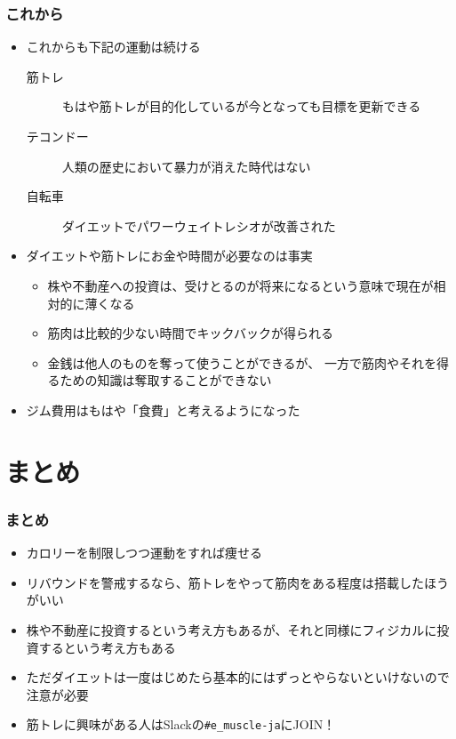 \begin{frame}
  \frametitle{これから}

  \pause
  \begin{itemize}
    \item<+-> これからも下記の運動は続ける
    \begin{description}
      \item[筋トレ]
      もはや筋トレが目的化しているが今となっても目標を更新できる

      \item[テコンドー]
      人類の歴史において暴力が消えた時代はない

      \item[自転車]
      ダイエットでパワーウェイトレシオが改善された
    \end{description}

    \item<+-> ダイエットや筋トレにお金や時間が必要なのは事実
    \begin{itemize}
      \item 株や不動産への投資は、受けとるのが将来になるという意味で現在が相対的に薄くなる
      \item 筋肉は比較的少ない時間でキックバックが得られる
      \item 金銭は他人のものを奪って使うことができるが、
    一方で筋肉やそれを得るための知識は奪取することができない
    \end{itemize}

    \item<+-> ジム費用はもはや「食費」と考えるようになった
  \end{itemize}
\end{frame}

\section{まとめ}

\begin{frame}
  \frametitle{まとめ}

  \pause
  \begin{itemize}
    \item<+-> カロリーを制限しつつ運動をすれば痩せる

    \item<+-> リバウンドを警戒するなら、筋トレをやって筋肉をある程度は搭載したほうがいい

    \item<+-> 株や不動産に投資するという考え方もあるが、それと同様にフィジカルに投資するという考え方もある

    \item<+-> ただダイエットは一度はじめたら基本的にはずっとやらないといけないので注意が必要

    \item<+-> 筋トレに興味がある人はSlackの\texttt{\#e\_muscle-ja}にJOIN！
  \end{itemize}
\end{frame}

